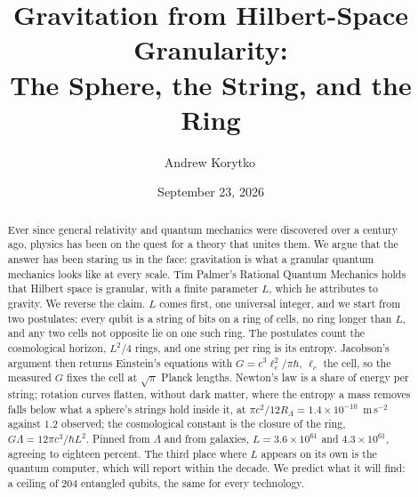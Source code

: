 \documentclass[aps,prd,twocolumn,superscriptaddress,nofootinbib,showkeys]{revtex4-2}
\newcommand{\lc}{\ell_c}
\newcommand{\RL}{R_\Lambda}
\begin{document}
\title{Gravitation from Hilbert-Space Granularity:\\ The Sphere, the String, and the Ring}

\author{Andrew Korytko\,}

\date{September 23, 2026}

\begin{abstract}
Ever since general relativity and quantum mechanics were discovered over a century ago, physics has been on the quest for a theory that unites them. We argue that the answer has been staring us in the face: gravitation is what a granular quantum mechanics looks like at every scale. Tim Palmer's Rational Quantum Mechanics holds that Hilbert space is granular, with a finite parameter $L$, which he attributes to gravity. We reverse the claim. $L$ comes first, one universal integer, and we start from two postulates: every qubit is a string of bits on a ring of cells, no ring longer than $L$, and any two cells not opposite lie on one such ring. The postulates count the cosmological horizon, $L^2/4$ rings, and one string per ring is its entropy. Jacobson's argument then returns Einstein's equations with $G = c^3\lc^2/\pi\hbar$, $\lc$ the cell, so the measured $G$ fixes the cell at $\sqrt\pi$ Planck lengths. Newton's law is a share of energy per string; rotation curves flatten, without dark matter, where the entropy a mass removes falls below what a sphere's strings hold inside it, at $\pi c^2/12\RL = 1.4\times10^{-10}$~m\,s$^{-2}$ against $1.2$ observed; the cosmological constant is the closure of the ring, $G\Lambda = 12\pi c^3/\hbar L^2$. Pinned from $\Lambda$ and from galaxies, $L = 3.6\times10^{61}$ and $4.3\times10^{61}$, agreeing to eighteen percent. The third place where $L$ appears on its own is the quantum computer, which will report within the decade. We predict what it will find: a ceiling of $204$ entangled qubits, the same for every technology.
\end{abstract}


\maketitle
\end{document}

